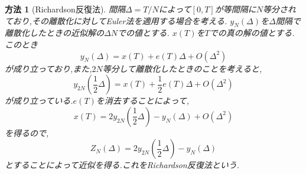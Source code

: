 \documentclass[a4paper]{jreport}
\numberwithin{equation}{section}
\newtheorem{Method}[Thm]{方法}
\renewenvironment{leftbar}{%
  \def\FrameCommand{\vrule width 1pt \hspace{10pt}}%
  \MakeFramed {\advance\hsize-\width \FrameRestore}}%
 {\endMakeFramed}
\def\method{\begin{leftbar}\begin{Method}}
\def\methodx{\end{Method}\end{leftbar}}
\def\eq{\begin{equation}}
\def\eqx{\end{equation}}
\begin{document}
\method[Richardson反復法]
間隔$\Delta = T/N$によって$[0,T]$が等間隔に$N$等分されており,その離散化に対してEuler法を適用する場合を考える.
$y_N(\Delta)$を$\Delta$間隔で離散化したときの近似解の$\Delta N$での値とする.
$x(T)$を$T$での真の解の値とする.このとき
\eq
y_N(\Delta) = x(T) + e(T) \Delta + O(\Delta^2)
\eqx
が成り立っており,また,$2N$等分して離散化したときのことを考えると,
\eq
y_{2N}(\frac{1}{2}\Delta) = x(T) + \frac{1}{2} e(T) \Delta + O(\Delta^2)
\eqx
が成り立っている.$e(T)$を消去することによって,
\eq
x(T) = 2y_{2N}(\frac{1}{2}\Delta) - y_N(\Delta) + O(\Delta^2)
\eqx
を得るので,
\eq
Z_N(\Delta) = 2y_{2N}(\frac{1}{2}\Delta) - y_N(\Delta)
\eqx
とすることによって近似を得る.これをRichardson反復法という.
\methodx
\end{document}
